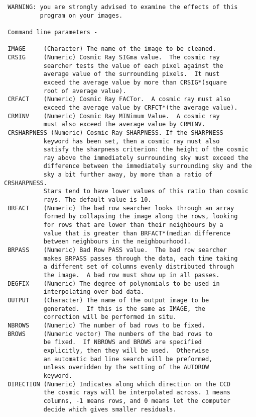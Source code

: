 \begin{description}
\begin{verbatim}
 WARNING: you are strongly advised to examine the effects of this
          program on your images.

 Command line parameters -

 IMAGE     (Character) The name of the image to be cleaned.
 CRSIG     (Numeric) Cosmic Ray SIGma value.  The cosmic ray
           searcher tests the value of each pixel against the
           average value of the surrounding pixels.  It must
           exceed the average value by more than CRSIG*(square
           root of average value).
 CRFACT    (Numeric) Cosmic Ray FACTor.  A cosmic ray must also
           exceed the average value by CRFCT*(the average value).
 CRMINV    (Numeric) Cosmic Ray MINimum Value.  A cosmic ray
           must also exceed the average value by CRMINV.
 CRSHARPNESS (Numeric) Cosmic Ray SHARPNESS. If the SHARPNESS
           keyword has been set, then a cosmic ray must also
           satisfy the sharpness criterion: the height of the cosmic
           ray above the immediately surrounding sky must exceed the
           difference between the immediately surrounding sky and the
           sky a bit further away, by more than a ratio of CRSHARPNESS.
           Stars tend to have lower values of this ratio than cosmic
           rays. The default value is 10.
 BRFACT    (Numeric) The bad row searcher looks through an array
           formed by collapsing the image along the rows, looking
           for rows that are lower than their neighbours by a
           value that is greater than BRFACT*(median difference
           between neighbours in the neighbourhood).
 BRPASS    (Numeric) Bad Row PASS value.  The bad row searcher
           makes BRPASS passes through the data, each time taking
           a different set of columns evenly distributed through
           the image.  A bad row must show up in all passes.
 DEGFIX    (Numeric) The degree of polynomials to be used in
           interpolating over bad data.
 OUTPUT    (Character) The name of the output image to be
           generated.  If this is the same as IMAGE, the
           correction will be performed in situ.
 NBROWS    (Numeric) The number of bad rows to be fixed.
 BROWS     (Numeric vector) The numbers of the bad rows to
           be fixed.  If NBROWS and BROWS are specified
           explicitly, then they will be used.  Otherwise
           an automatic bad line search will be preformed,
           unless overidden by the setting of the AUTOROW
           keyword.
 DIRECTION (Numeric) Indicates along which direction on the CCD
           the cosmic rays will be interpolated across. 1 means
           columns, -1 means rows, and 0 means let the computer
           decide which gives smaller residuals.


\end{verbatim}
\end{description}
